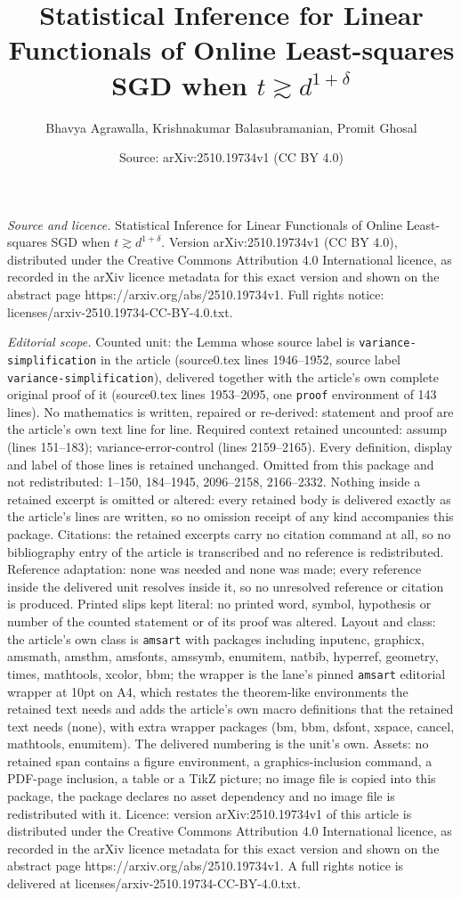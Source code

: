 \documentclass[10pt,a4paper]{amsart}
\title[Statistical Inference for Linear Functionals of Online Least]{Statistical Inference for Linear Functionals of Online Least-squares SGD when $t \gtrsim d^{1+\delta}$}
\author{Bhavya Agrawalla, Krishnakumar Balasubramanian, Promit Ghosal}
\date{Source: arXiv:2510.19734v1 (CC BY 4.0)}
\begin{document}
\maketitle

\noindent\emph{Source and licence.} Statistical Inference for Linear Functionals of Online Least-squares SGD when $t \gtrsim d^{1+\delta}$. Version arXiv:2510.19734v1 (CC BY 4.0), distributed under the Creative Commons Attribution 4.0 International licence, as recorded in the arXiv licence metadata for this exact version and shown on the abstract page https://arxiv.org/abs/2510.19734v1. Full rights notice: licenses/arxiv-2510.19734-CC-BY-4.0.txt.\par\smallskip

\noindent\textit{Editorial scope.} Counted unit: the Lemma whose source label is \texttt{variance-simplification} in the article (source0.tex lines 1946--1952, source label \texttt{variance-simplification}), delivered together with the article's own complete original proof of it (source0.tex lines 1953--2095, one \texttt{proof} environment of 143 lines). No mathematics is written, repaired or re-derived: statement and proof are the article's own text line for line. Required context retained uncounted: assump (lines 151--183); variance-error-control (lines 2159--2165). Every definition, display and label of those lines is retained unchanged. Omitted from this package and not redistributed: 1--150, 184--1945, 2096--2158, 2166--2332. Nothing inside a retained excerpt is omitted or altered: every retained body is delivered exactly as the article's lines are written, so no omission receipt of any kind accompanies this package. Citations: the retained excerpts carry no citation command at all, so no bibliography entry of the article is transcribed and no reference is redistributed. Reference adaptation: none was needed and none was made; every reference inside the delivered unit resolves inside it, so no unresolved reference or citation is produced. Printed slips kept literal: no printed word, symbol, hypothesis or number of the counted statement or of its proof was altered. Layout and class: the article's own class is \texttt{amsart} with packages including inputenc, graphicx, amsmath, amsthm, amsfonts, amssymb, enumitem, natbib, hyperref, geometry, times, mathtools, xcolor, bbm; the wrapper is the lane's pinned \texttt{amsart} editorial wrapper at 10pt on A4, which restates the theorem-like environments the retained text needs and adds the article's own macro definitions that the retained text needs (none), with extra wrapper packages (bm, bbm, dsfont, xspace, cancel, mathtools, enumitem). The delivered numbering is the unit's own. Assets: no retained span contains a figure environment, a graphics-inclusion command, a PDF-page inclusion, a table or a TikZ picture; no image file is copied into this package, the package declares no asset dependency and no image file is redistributed with it. Licence: version arXiv:2510.19734v1 of this article is distributed under the Creative Commons Attribution 4.0 International licence, as recorded in the arXiv licence metadata for this exact version and shown on the abstract page https://arxiv.org/abs/2510.19734v1. A full rights notice is delivered at licenses/arxiv-2510.19734-CC-BY-4.0.txt. 
\end{document}
